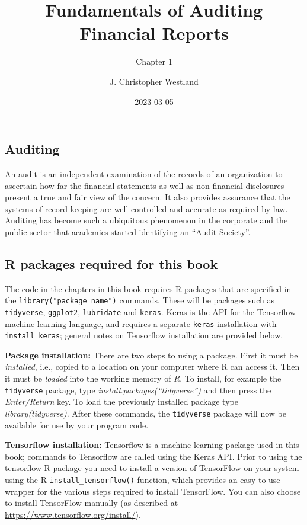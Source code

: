 \documentclass[
]{article}
\title{Fundamentals of Auditing Financial Reports}
\subtitle{Chapter 1}
\author{J. Christopher Westland}
\date{2023-03-05}
\begin{document}
\maketitle

\hypertarget{auditing}{%
\subsection{Auditing}\label{auditing}}

An audit is an independent examination of the records of an organization
to ascertain how far the financial statements as well as non-financial
disclosures present a true and fair view of the concern. It also
provides assurance that the systems of record keeping are
well-controlled and accurate as required by law. Auditing has become
such a ubiquitous phenomenon in the corporate and the public sector that
academics started identifying an ``Audit Society''.

\hypertarget{r-packages-required-for-this-book}{%
\subsection{R packages required for this
book}\label{r-packages-required-for-this-book}}

The code in the chapters in this book requires R packages that are
specified in the \texttt{library("package\_name")} commands. These will
be packages such as \texttt{tidyverse}, \texttt{ggplot2},
\texttt{lubridate} and \texttt{keras}. Keras is the API for the
Tensorflow machine learning language, and requires a separate
\texttt{keras} installation with \texttt{install\_keras}; general notes
on Tensorflow installation are provided below.

\textbf{Package installation:} There are two steps to using a package.
First it must be \emph{installed}, i.e., copied to a location on your
computer where R can access it. Then it must be \emph{loaded} into the
working memory of \emph{R}. To install, for example the
\texttt{tidyverse} package, type \emph{install.packages(``tidyverse'')}
and then press the \emph{Enter/Return} key. To load the previously
installed package type \emph{library(tidyverse)}. After these commands,
the \texttt{tidyverse} package will now be available for use by your
program code.

\textbf{Tensorflow installation:} Tensorflow is a machine learning
package used in this book; commands to Tensorflow are called using the
Keras API. Prior to using the tensorflow R package you need to install a
version of TensorFlow on your system using the R
\texttt{install\_tensorflow()} function, which provides an easy to use
wrapper for the various steps required to install TensorFlow. You can
also choose to install TensorFlow manually (as described at
\url{https://www.tensorflow.org/install/}).
\end{document}
